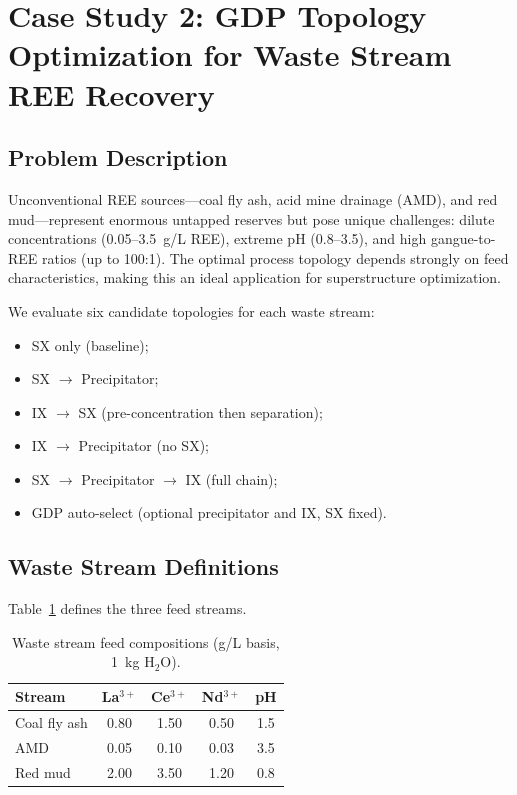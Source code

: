 \documentclass[11pt]{article}
\begin{document}
\section{Case Study 2: GDP Topology Optimization for Waste Stream REE Recovery}\label{sec:case2}

\subsection{Problem Description}

Unconventional REE sources---coal fly ash, acid mine drainage (AMD),
and red mud---represent enormous untapped reserves but pose unique
challenges: dilute concentrations (0.05--3.5~g/L REE), extreme pH
(0.8--3.5), and high gangue-to-REE ratios (up to 100:1).  The optimal
process topology depends strongly on feed characteristics, making this
an ideal application for superstructure optimization.

We evaluate six candidate topologies for each waste stream:
\begin{itemize}
  \item[\textbf{A}:] SX only (baseline);
  \item[\textbf{B}:] SX $\rightarrow$ Precipitator;
  \item[\textbf{C}:] IX $\rightarrow$ SX (pre-concentration then
    separation);
  \item[\textbf{D}:] IX $\rightarrow$ Precipitator (no SX);
  \item[\textbf{E}:] SX $\rightarrow$ Precipitator $\rightarrow$ IX
    (full chain);
  \item[\textbf{F}:] GDP auto-select (optional precipitator and IX,
    SX fixed).
\end{itemize}

\subsection{Waste Stream Definitions}

Table~\ref{tab:waste} defines the three feed streams.

\begin{table}[t]
  \centering
  \caption{Waste stream feed compositions (g/L basis, 1~kg H$_2$O).}
  \label{tab:waste}
  \begin{tabular}{@{}lcccc@{}}
    \toprule
    Stream & La$^{3+}$ & Ce$^{3+}$ & Nd$^{3+}$ & pH \\
    \midrule
    Coal fly ash  & 0.80 & 1.50 & 0.50 & 1.5 \\
    AMD           & 0.05 & 0.10 & 0.03 & 3.5 \\
    Red mud       & 2.00 & 3.50 & 1.20 & 0.8 \\
    \bottomrule
  \end{tabular}
\end{table}
\end{document}
